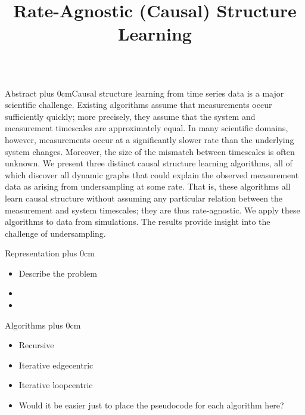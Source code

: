\documentclass[final,hyperref={pdfpagelabels=false}]{beamer}
\title[Fancy  Posters]{Rate-Agnostic (Causal) Structure Learning}  \author[Plis et
\renewcommand{\raggedright}{\leftskip=0.5cm \rightskip=0.5cm plus 0cm}
\begin{document}
  \begin{frame}{} 
    \begin{columns}[t]
      \begin{column}{.48\linewidth}
        \begin{block}{\Large Abstract}
          \raggedright Causal structure learning from time series data is a major scientific challenge.  Existing algorithms assume that measurements occur sufficiently quickly; more precisely, they assume that the system and measurement timescales are approximately equal. In many scientific domains, however, measurements occur at a significantly slower rate than the underlying system changes.  Moreover, the size of the mismatch between timescales is often unknown. We present three distinct causal structure learning algorithms, all of which discover all dynamic graphs that could explain the observed measurement data as arising from undersampling at some rate. That is, these algorithms all learn causal structure without assuming any particular relation between the measurement and system timescales; they are thus rate-agnostic. We apply these algorithms to data from simulations. The results provide insight into the challenge of undersampling.
        \end{block}
        \begin{block}{\Large Representation}
          \raggedright 
          \begin{itemize}
          \item  Describe the problem
          \item 
          \item 
          \end{itemize}
        \end{block}
        \begin{block}{\Large Algorithms}
          \raggedright  
          \begin{itemize}
          \item Recursive
          \item Iterative edgecentric
          \item Iterative loopcentric
          \item Would it be easier just to place the pseudocode for each algorithm here?
          \end{itemize}
        \end{block}
  


\end{column}
\end{columns}
\end{frame}
\end{document}

